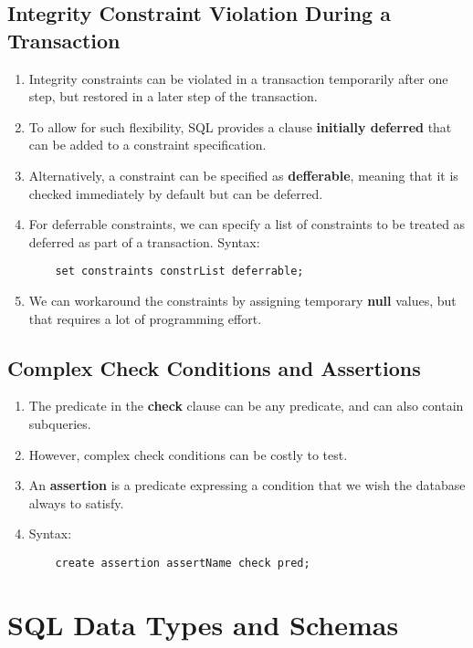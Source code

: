 \documentclass[journal,12pt,twocolumn]{IEEEtran}
\begin{document}
\subsection{Integrity Constraint Violation During a Transaction}
\begin{enumerate}
    \item Integrity constraints can be violated in a transaction temporarily 
    after one step, but restored in a later step of the transaction.
    \item To allow for such flexibility, SQL provides a clause 
    \textbf{initially deferred} that can be added to a constraint specification.
    \item Alternatively, a constraint can be specified as \textbf{defferable}, 
    meaning that it is checked immediately by default but can be deferred.
    \item For deferrable constraints, we can specify a list of constraints to 
    be treated as deferred as part of a transaction. Syntax:
    \begin{lstlisting}
    set constraints constrList deferrable;
    \end{lstlisting}
    \item We can workaround the constraints by assigning temporary \textbf{null} 
    values, but that requires a lot of programming effort.
\end{enumerate}

\subsection{Complex Check Conditions and Assertions}
\begin{enumerate}
    \item The predicate in the \textbf{check} clause can be any predicate, and 
    can also contain subqueries.
    \item However, complex check conditions can be costly to test.
    \item An \textbf{assertion} is a predicate expressing a condition that we 
    wish the database always to satisfy.
    \item Syntax: 
    \begin{lstlisting}
    create assertion assertName check pred;
    \end{lstlisting}
\end{enumerate}

\section{SQL Data Types and Schemas}
\end{document}
